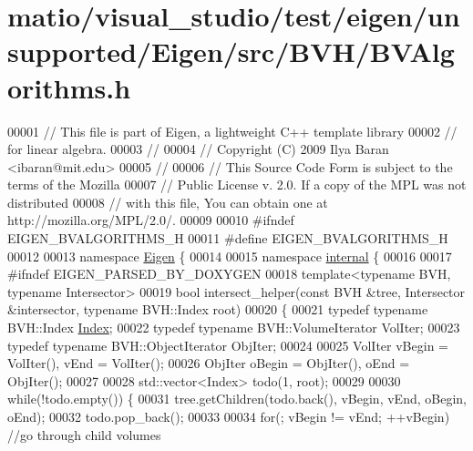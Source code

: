 \hypertarget{matio_2visual__studio_2test_2eigen_2unsupported_2_eigen_2src_2_b_v_h_2_b_v_algorithms_8h_source}{}\section{matio/visual\+\_\+studio/test/eigen/unsupported/\+Eigen/src/\+B\+V\+H/\+B\+V\+Algorithms.h}
\label{matio_2visual__studio_2test_2eigen_2unsupported_2_eigen_2src_2_b_v_h_2_b_v_algorithms_8h_source}

\begin{DoxyCode}
00001 \textcolor{comment}{// This file is part of Eigen, a lightweight C++ template library}
00002 \textcolor{comment}{// for linear algebra.}
00003 \textcolor{comment}{//}
00004 \textcolor{comment}{// Copyright (C) 2009 Ilya Baran <ibaran@mit.edu>}
00005 \textcolor{comment}{//}
00006 \textcolor{comment}{// This Source Code Form is subject to the terms of the Mozilla}
00007 \textcolor{comment}{// Public License v. 2.0. If a copy of the MPL was not distributed}
00008 \textcolor{comment}{// with this file, You can obtain one at http://mozilla.org/MPL/2.0/.}
00009 
00010 \textcolor{preprocessor}{#ifndef EIGEN\_BVALGORITHMS\_H}
00011 \textcolor{preprocessor}{#define EIGEN\_BVALGORITHMS\_H}
00012 
00013 \textcolor{keyword}{namespace }\hyperlink{namespace_eigen}{Eigen} \{ 
00014 
00015 \textcolor{keyword}{namespace }\hyperlink{namespaceinternal}{internal} \{
00016 
00017 \textcolor{preprocessor}{#ifndef EIGEN\_PARSED\_BY\_DOXYGEN}
00018 \textcolor{keyword}{template}<\textcolor{keyword}{typename} BVH, \textcolor{keyword}{typename} Intersector>
00019 \textcolor{keywordtype}{bool} intersect\_helper(\textcolor{keyword}{const} BVH &tree, Intersector &intersector, \textcolor{keyword}{typename} BVH::Index root)
00020 \{
00021   \textcolor{keyword}{typedef} \textcolor{keyword}{typename} BVH::Index \hyperlink{namespace_eigen_a62e77e0933482dafde8fe197d9a2cfde}{Index};
00022   \textcolor{keyword}{typedef} \textcolor{keyword}{typename} BVH::VolumeIterator VolIter;
00023   \textcolor{keyword}{typedef} \textcolor{keyword}{typename} BVH::ObjectIterator ObjIter;
00024 
00025   VolIter vBegin = VolIter(), vEnd = VolIter();
00026   ObjIter oBegin = ObjIter(), oEnd = ObjIter();
00027 
00028   std::vector<Index> todo(1, root);
00029 
00030   \textcolor{keywordflow}{while}(!todo.empty()) \{
00031     tree.getChildren(todo.back(), vBegin, vEnd, oBegin, oEnd);
00032     todo.pop\_back();
00033 
00034     \textcolor{keywordflow}{for}(; vBegin != vEnd; ++vBegin) \textcolor{comment}{//go through child volumes}

\end{DoxyCode}
